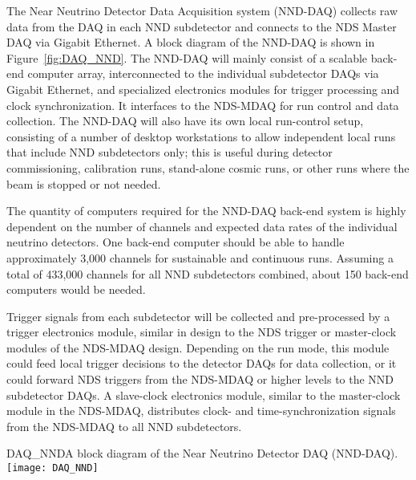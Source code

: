 
The Near Neutrino Detector Data Acquisition system (NND-DAQ) collects raw data from 
the DAQ in each %
NND subdetector and connects to the %
NDS Master DAQ via Gigabit Ethernet. A block diagram of the NND-DAQ is
shown in Figure~\ref{fig:DAQ_NND}. The NND-DAQ will mainly consist 
of a scalable back-end computer array, interconnected to the individual %
subdetector DAQs via Gigabit Ethernet, and specialized electronics modules for trigger 
processing and clock synchronization. It interfaces to the NDS-MDAQ for 
run control and data collection. The NND-DAQ will also have its own local run-control setup, 
consisting of a number of desktop workstations to allow independent local runs that include 
NND subdetectors only; this is useful during detector commissioning, calibration runs, 
stand-alone cosmic runs, or other runs where the beam is stopped or not needed.

The quantity of computers required for the NND-DAQ back-end system is highly dependent on the 
number of channels and expected data rates of the individual neutrino detectors. 
One back-end computer should be able to handle 
approximately 3,000 channels for sustainable and continuous runs. Assuming a total of 
433,000 channels for all NND subdetectors combined, about 150 back-end computers would be 
needed.

Trigger signals from each subdetector will be collected and pre-processed by a 
trigger electronics module, similar in design to the NDS  trigger or master-clock modules 
of the NDS-MDAQ design. Depending on the run mode, this module could feed local 
trigger 
decisions to the detector DAQs for data collection, or it could forward NDS triggers 
from the NDS-MDAQ or higher levels to the NND subdetector DAQs.  A slave-clock electronics 
module, similar to the master-clock module in the NDS-MDAQ, distributes clock- and 
time-synchronization signals from the NDS-MDAQ to all NND subdetectors.


\begin{cdrfigure}{DAQ_NND}{A block diagram of the Near Neutrino Detector DAQ (NND-DAQ).}
\texttt{[image: DAQ\_NND]}
\end{cdrfigure}



